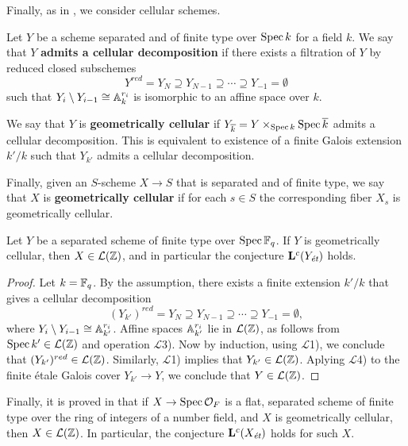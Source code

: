 \documentclass{article}
\numberwithin{equation}{section}
\begin{document}
Finally, as in \cite[\S 5.4]{Morin-2014}, we consider cellular schemes.

\begin{definition}
  Let $Y$ be a scheme separated and of finite type over $\Spec k$ for a field
  $k$. We say that $Y$ \textbf{admits a cellular decomposition} if there exists
  a filtration of $Y$ by reduced closed subschemes
  $$Y^{red} = Y_N \supseteq Y_{N-1} \supseteq \cdots \supseteq Y_{-1} = \emptyset$$
  such that $Y_i\setminus Y_{i-1} \cong \AA^{r_i}_k$ is isomorphic to an affine
  space over $k$.

  We say that $Y$ is \textbf{geometrically cellular} if
  $Y_{\overline{k}} = Y \times_{\Spec k} \Spec \overline{k}$ admits a cellular
  decomposition. This is equivalent to existence of a finite Galois extension
  $k'/k$ such that $Y_{k'}$ admits a cellular decomposition.

  Finally, given an $S$-scheme $X \to S$ that is separated and of finite type,
  we say that $X$ is \textbf{geometrically cellular} if for each $s \in S$ the
  corresponding fiber $X_s$ is geometrically cellular.
\end{definition}

\begin{proposition}
  Let $Y$ be a separated scheme of finite type over $\Spec \FF_q$.
  If $Y$ is geometrically cellular, then $X \in \mathcal{L} (\ZZ)$,
  and in particular the conjecture $\mathbf{L}^c (Y_\et)$ holds.

  \begin{proof}
    Let $k = \FF_q$. By the assumption, there exists a finite extension $k'/k$
    that gives a cellular decomposition
    $$(Y_{k'})^{red} = Y_N \supseteq Y_{N-1} \supseteq \cdots \supseteq Y_{-1} = \emptyset,$$
    where $Y_i \setminus Y_{i-1} \cong \AA^{r_i}_{k'}$. Affine spaces
    $\AA^{r_i}_{k'}$ lie in $\mathcal{L} (\ZZ)$, as follows from
    $\Spec k' \in \mathcal{L} (\ZZ)$ and operation $\mathcal{L}$3). Now by
    induction, using $\mathcal{L}$1), we conclude that
    $(Y_{k'})^{red} \in \mathcal{L} (\ZZ)$. Similarly, $\mathcal{L}$1) implies
    that $Y_{k'} \in \mathcal{L} (\ZZ)$. Aplying $\mathcal{L}$4) to the finite
    étale Galois cover $Y_{k'} \to Y$, we conclude that
    $Y \in \mathcal{L} (\ZZ)$.
  \end{proof}
\end{proposition}

Finally, it is proved in \cite[Proposition~5.14]{Morin-2014} that if
$X \to \Spec \mathcal{O}_F$ is a flat, separated scheme of finite type over the
ring of integers of a number field, and $X$ is geometrically cellular, then
$X \in \mathcal{L} (\ZZ)$. In particular, the conjecture $\mathbf{L}^c (X_\et)$
holds for such $X$.
\end{document}
